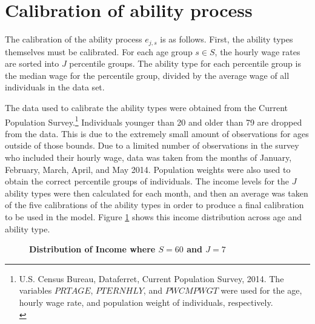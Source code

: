 \documentclass[letterpaper,12pt]{article}
\theoremstyle{definition}
\begin{document}
\newpage
\section{Calibration of ability process}\label{AppAbilCalib}

  \setcounter{equation}{0}

  The calibration of the ability process $e_{j,s}$ is as follows.  First, the ability types themselves must be calibrated. For each age group $s \in S$, the hourly wage rates are sorted into $J$ percentile groups.  The ability type for each percentile group is the median wage for the percentile group, divided by the average wage of all individuals in the data set.

  The data used to calibrate the ability types were obtained from the Current Population Survey.\footnote{U.S. Census Bureau, Dataferret, Current Population Survey, 2014. The variables $PRTAGE$, $PTERNHLY$, and $PWCMPWGT$ were used for the age, hourly wage rate, and population weight of individuals, respectively. \\ [-2pt]} Individuals younger than 20 and older than 79 are dropped from the data. This is due to the extremely small amount of observations for ages outside of those bounds. Due to a limited number of observations in the survey who included their hourly wage, data was taken from the months of January, February, March, April, and May 2014.  Population weights were also used to obtain the correct percentile groups of individuals.  The income levels for the $J$ ability types were then calculated for each month, and then an average was taken of the five calibrations of the ability types in order to produce a final calibration to be used in the model. Figure \ref{FigIncome} shows this income distribution across age and ability type.

    \begin{figure}[htb]\centering \captionsetup{width=4.0in}
      \caption{\label{FigIncome}\textbf{Distribution of Income where $S=60$ and $J=7$}}
    \end{figure}
\end{document}
